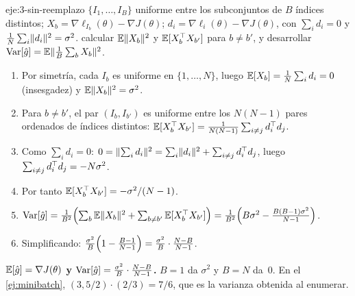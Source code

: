 \begin{solucion}{eje:3-sin-reemplazo}
\datos $\{I_1,\dots,I_B\}$ uniforme entre los subconjuntos de $B$ índices distintos; $X_b=\nabla\ell_{I_b}(\theta)-\nabla J(\theta)$; $d_i=\nabla\ell_i(\theta)-\nabla J(\theta)$, con $\sum_i d_i=0$ y $\frac1N\sum_i\lVert d_i\rVert^{2}=\sigma^{2}$.
\planteamiento calcular $\mathbb{E}\lVert X_b\rVert^{2}$ y $\mathbb{E}[X_b^{\top} X_{b'}]$ para $b\ne b'$, y desarrollar $\operatorname{Var}[\hat g]=\mathbb{E}\lVert\frac1B\sum_bX_b\rVert^{2}$.
\pasos
\begin{enumerate}[label=\arabic*.]
  \item Por simetría, cada $I_b$ es uniforme en $\{1,\dots,N\}$, luego $\mathbb{E}[X_b]=\frac1N\sum_id_i=0$ (insesgadez) y $\mathbb{E}\lVert X_b\rVert^{2}=\sigma^{2}$.
  \item Para $b\ne b'$, el par $(I_b,I_{b'})$ es uniforme entre los $N(N-1)$ pares ordenados de índices distintos: $\mathbb{E}[X_b^{\top} X_{b'}]=\frac{1}{N(N-1)}\sum_{i\ne j}d_i^{\top} d_j$.
  \item Como $\sum_id_i=0$: $0=\lVert\sum_id_i\rVert^{2}=\sum_i\lVert d_i\rVert^{2}+\sum_{i\ne j}d_i^{\top} d_j$, luego $\sum_{i\ne j}d_i^{\top} d_j=-N\sigma^{2}$.
  \item Por tanto $\mathbb{E}[X_b^{\top} X_{b'}]=-\sigma^{2}/(N-1)$.
  \item $\operatorname{Var}[\hat g]=\frac{1}{B^{2}}\Bigl(\sum_b\mathbb{E}\lVert X_b\rVert^{2}+\sum_{b\ne b'}\mathbb{E}[X_b^{\top} X_{b'}]\Bigr)=\frac{1}{B^{2}}\Bigl(B\sigma^{2}-\frac{B(B-1)\sigma^{2}}{N-1}\Bigr)$.
  \item Simplificando: $\frac{\sigma^{2}}{B}\Bigl(1-\frac{B-1}{N-1}\Bigr)=\frac{\sigma^{2}}{B}\cdot\frac{N-B}{N-1}$.
\end{enumerate}
\resultado \textbf{$\mathbb{E}[\hat g]=\nabla J(\theta)$ y $\operatorname{Var}[\hat g]=\frac{\sigma^{2}}{B}\cdot\frac{N-B}{N-1}$.}
\comprobacion $B=1$ da $\sigma^{2}$ y $B=N$ da~0. En el \cref{ej:minibatch}, $(3{,}5/2)\cdot(2/3)=7/6$, que es la varianza obtenida al enumerar.
\end{solucion}

